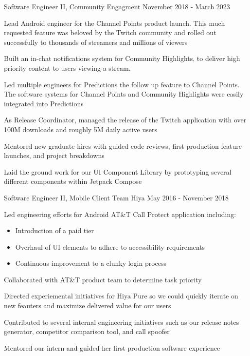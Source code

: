 \begin{cventries}
  \cventry
    {Software Engineer II, Community Engagment} %
    {} %
    {} %
    {November 2018 - March 2023} %
    {
    \begin{cvitems} %
    \item Lead Android engineer for the Channel Points product launch. This much requested feature was beloved by the Twitch community and rolled out successfully to thousands of streamers and millions of viewers 
    \item Built an in-chat notifications system for Community Highlights, to deliver high priority content to users viewing a stream.
    \item Led multiple engineers for Predictions the follow up feature to Channel Points. The software systems for Channel Points and Community Highlights were easily integrated into Predictions
    \item As Release Coordinator, managed the release of the Twitch application with over 100M downloads and roughly 5M daily active users
    \item Mentored new graduate hires with guided code reviews, first production feature launches, and project breakdowns
    \item Laid the ground work for our UI Component Library by prototyping several different components within Jetpack Compose 
    \end{cvitems}
    }

 \cventry
    {Software Engineer II, Mobile Client Team} %
    {Hiya} %
    {} %
    {May 2016 - November 2018} %
    {
    \begin{cvitems} %
    \item { Led engineering efforts for Android AT\&T Call Protect application including:
        \begin{itemize}
            \item Introduction of a paid tier
            \item Overhaul of UI elements to adhere to accessibility requirements
            \item Continuous improvement to a clunky login process
        \end{itemize}}
    \item Collaborated with AT\&T product team to determine task priority
    \item Directed experiemental initiatives for Hiya Pure so we could quickly iterate on new feauters and maximize delivered value for our users
    \item Contributed to several internal engineering initiatives such as our release notes generator, competitor comparison tool, and call spoofer
    \item Mentored our intern and guided her first production software experience
    \end{cvitems}
    }


\end{cventries}
